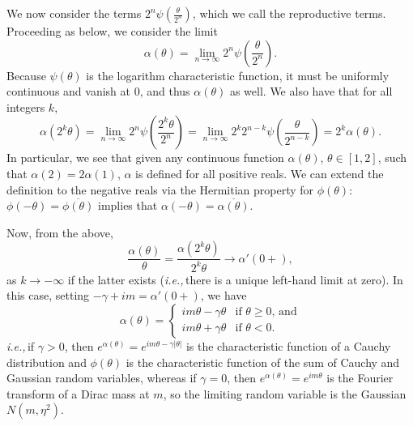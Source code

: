 \documentclass{article}
\newcommand{\ie}{\textit{i.e.,}\,}
\newcommand{\eg}{\textit{e.g.,}\,}
\theoremstyle{remark}
\theoremstyle{definition}
\begin{document}
We now consider the terms $2^{n} \psi\left(\frac{\theta}{2^{n}}\right)$, which we call the reproductive terms.  Proceeding as below, we consider the limit
\[
		\alpha(\theta) = \lim_{n \to \infty} 2^{n}\psi\left(\frac{\theta}{2^{n}}\right).
\]
Because $\psi(\theta)$ is the logarithm characteristic function, it must be uniformly continuous and vanish at 0, and thus $\alpha(\theta)$ as well.  We also have that for all integers $k$, 
\[
	\alpha(2^{k} \theta) = \lim_{n \to \infty} 2^{n}\psi\left(\frac{2^{k} \theta}{2^{n}}\right) =  \lim_{n \to \infty} 2^{k} 2^{n-k} \psi\left(\frac{\theta}{2^{n-k}}\right) = 2^{k} \alpha(\theta).
\]
In particular, we see that given any continuous function $\alpha(\theta)$, $\theta \in [1,2]$, such that $\alpha(2) = 2\alpha(1)$, $\alpha$ is defined for all positive reals.  We can extend the definition to the negative reals via the Hermitian property for $\phi(\theta)$: $\phi(-\theta) = \overline{\phi(\theta)}$ implies that $\alpha(-\theta) = \overline{\alpha(\theta)}$. 

Now, from the above, 
\[
	\frac{\alpha(\theta)}{\theta} = \frac{\alpha(2^{k} \theta)}{2^{k}\theta} \to \alpha'(0+),
\]
as $k \to - \infty$ if the latter exists (\ie there is a unique left-hand limit at zero).  In this case, setting $-\gamma + i m = \alpha'(0+)$, we have
\[
	\alpha(\theta) = \begin{cases} 
		i m\theta - \gamma \theta & \text{if $\theta \geq 0$, and}\\
		i m\theta + \gamma \theta & \text{if $\theta < 0$}.
	\end{cases}
\]
\ie if $\gamma > 0$, then $e^{\alpha(\theta)} = e^{im \theta -\gamma|\theta|}$ is the characteristic function of a Cauchy distribution and $\phi(\theta)$ is the characteristic function of the sum of Cauchy and Gaussian random variables, whereas if $\gamma = 0$, then $e^{\alpha(\theta)} = e^{im \theta}$ is the Fourier transform of a Dirac mass at $m$, so the limiting random variable is the Gaussian $N(m,\eta^{2})$. 
\end{document}
